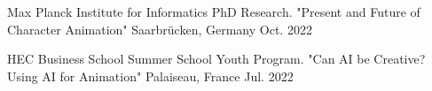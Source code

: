 

\begin{cventries}


\cvtalk
    {Max Planck Institute for Informatics} %
    {PhD Research. "Present and Future of Character Animation"} %
    {Saarbrücken, Germany} %
    {Oct. 2022} %

\cvtalk
    {HEC Business School} %
    {Summer School Youth Program. "Can AI be Creative? Using AI for Animation"} %
    {Palaiseau, France} %
    {Jul. 2022} %







\end{cventries}
